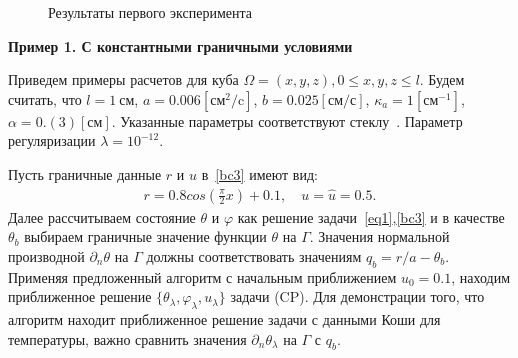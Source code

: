 \documentclass[12pt]{article}
\begin{document}
    \begin{figure}[H]
        \centering
        \caption{Результаты первого эксперимента}
    \end{figure}

    \textbf{Пример 1. С константными граничными условиями}

    Приведем примеры расчетов для куба
    $\Omega = {(x, y, z), 0 \leq x,y,z \leq l}$.
    Будем считать, что $l=1~\text{см}$, $a = 0.006[\text{см}^2/\text{c}]$,
    $b=0.025[\text{см}/\text{с}]$,
    $\kappa_a=1[\text{см}^{-1}]$, $\alpha = 0.(3)[\text{см}]$.
    Указанные параметры соответствуют стеклу~\cite{Grenkin5}.
    Параметр регуляризации $\lambda=10^{-12}.$

    Пусть граничные данные $r$ и $u$ в~\eqref{bc3} имеют вид:
    \begin{gather*}
        r = 0.8 cos(\frac{\pi}{2}x) + 0.1,\quad
        u = \hat u = 0.5.
    \end{gather*}
    Далее рассчитываем состояние $\theta$ и $\varphi$ как решение задачи~\eqref{eq1},\eqref{bc3} и в качестве
    $\theta_b$ выбираем граничные значение функции $\theta$ на $\Gamma$.
    Значения нормальной производной $\partial_n\theta$ на $\Gamma$ должны соответствовать
    значениям $q_b=r/a-\theta_b.$
    Применяя предложенный алгоритм с начальным приближением $u_0 = 0.1$, находим приближенное решение
    $\{\theta_\lambda,\varphi_\lambda,u_\lambda\}$ задачи (CP)\@.
    Для демонстрации того, что алгоритм находит приближенное решение задачи с данными
    Коши для температуры, важно сравнить значения $\partial_n\theta_\lambda$ на $\Gamma$ с $q_b.$
\end{document}

